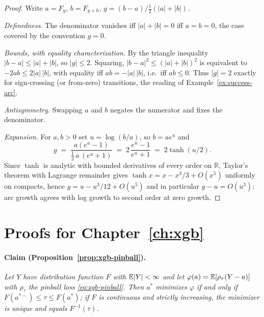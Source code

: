 \begin{proof}
Write $a = F_y$, $b = F_{y+h}$, $g = (b-a)\big/\tfrac12(|a| + |b|)$.

\emph{Definedness.} The denominator vanishes iff $|a| + |b| = 0$ iff $a = b = 0$, the case covered
by the convention $g = 0$.

\emph{Bounds, with equality characterization.} By the triangle inequality $|b - a| \le |a| + |b|$,
so $|g| \le 2$. Squaring, $|b-a|^2 \le (|a|+|b|)^2$ is equivalent to $-2ab \le 2|a|\,|b|$, with
equality iff $ab = -|a|\,|b|$, i.e.\ iff $ab \le 0$. Thus $|g| = 2$ exactly for sign-crossing (or
from-zero) transitions, the reading of Example~\ref{ex:success-arc}.

\emph{Antisymmetry.} Swapping $a$ and $b$ negates the numerator and fixes the denominator.

\emph{Expansion.} For $a, b > 0$ set $u = \log(b/a)$, so $b = a e^{u}$ and
\[
g \;=\; \frac{a(e^{u} - 1)}{\tfrac12\, a\,(e^{u} + 1)} \;=\; 2\,\frac{e^{u} - 1}{e^{u} + 1}
\;=\; 2\tanh(u/2).
\]
Since $\tanh$ is analytic with bounded derivatives of every order on $\mathbb{R}$, Taylor's theorem
with Lagrange remainder gives $\tanh x = x - x^3/3 + O(x^5)$ uniformly on compacts, hence $g = u -
u^3/12 + O(u^5)$ and in particular $g - u = O(u^3)$: arc growth agrees with log growth to second
order at zero growth.
\end{proof}

\section{Proofs for Chapter~\ref{ch:xgb}}
\label{app:proofs-ch4}

\paragraph{Claim (Proposition~\ref{prop:xgb-pinball}).}
\emph{Let $Y$ have distribution function $F$ with $\mathbb{E}|Y| < \infty$ and let $\varphi(a) =
\mathbb{E}[\rho_\tau(Y - a)]$ with $\rho_\tau$ the pinball loss \eqref{eq:xgb-pinball}. Then $a^*$ minimizes
$\varphi$ if and only if $F(a^{*-}) \le \tau \le F(a^*)$; if $F$ is continuous and strictly
increasing, the minimizer is unique and equals $F^{-1}(\tau)$.}

